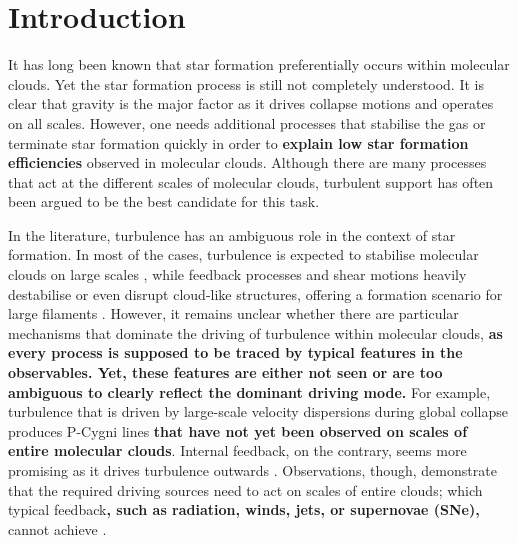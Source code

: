 \section{Introduction}\label{intro}

It has long been known that star formation preferentially occurs within molecular clouds. 
Yet 
       the star formation process is still not completely understood.
It is clear that gravity is the major factor as it drives collapse motions and operates on all scales.
However, one needs additional processes that stabilise the gas
      or terminate star formation quickly 
in order to \textbf{explain low star formation efficiencies} observed in molecular clouds. 
Although there are many processes that act at the different scales of molecular clouds,
     turbulent support has often been argued 
to be the best candidate for this task.

In the literature, turbulence has an ambiguous role in the context of star formation. 
In most of the cases, turbulence is expected to stabilise molecular clouds on large scales \citep{Fleck1980,McKee1992,MacLow2003}, while feedback processes and shear motions heavily destabilise or even disrupt cloud-like structures, offering a formation scenario for large filaments \citep{Tan2013,Miyamoto2014}. 
However, it remains unclear whether there are particular mechanisms that dominate the driving of turbulence within molecular clouds, \textbf{as every process is supposed to be traced by typical features in the observables.
Yet, these features are either not seen or are too ambiguous to clearly reflect the dominant driving mode.}
For example, turbulence that is driven by large-scale velocity dispersions during global collapse \citep{Ballesteros2011a,Ballesteros2011b,Hartmann2012} produces P-Cygni lines \textbf{ that have not yet been observed on scales of entire molecular clouds}. 
Internal feedback, on the contrary, seems more promising as it drives turbulence outwards \citep{Dekel2013,Krumholz2014}.
Observations, though, demonstrate that the required driving sources need to act on scales of entire clouds; which typical feedback\textbf{, such as radiation, winds, jets, or supernovae (SNe),} 
cannot achieve \citep{Heyer2004,Brunt2009,Brunt2013}.

